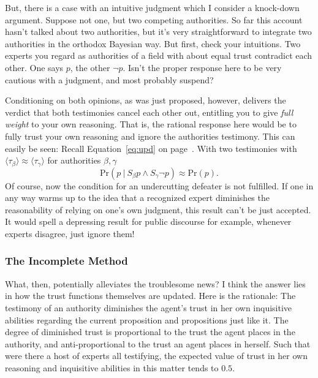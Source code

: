\documentclass[11pt, a4paper]{scrartcl}
\newcommand{\given}[1][]{\:#1\vert\:}
\renewcommand{\Pr}{\text{Pr}}
\renewcommand{\i}[1]{\emph{#1}}
\begin{document}
But, there is a case with an intuitive judgment which I consider a knock-down argument. Suppose not one, but two competing authorities. So far this account hasn't talked about two authorities, but it's very straightforward to integrate two authorities in the orthodox Bayesian way. But first, check your intuitions. Two experts you regard as authorities of a field with about equal trust contradict each other. One says $p$, the other $\neg p$. Isn't the proper response here to be very cautious with a judgment, and most probably suspend? 

Conditioning on both opinions, as was just proposed, however, delivers the verdict that both testimonies cancel each other out, entitling you to give \i{full weight} to your own reasoning. That is, the rational response here would be to fully trust your own reasoning and ignore the authorities testimony. This can easily be seen: Recall Equation~\ref{eq:upd} on page~\pageref{eq:upd}. With two testimonies with $\langle \tau_\beta \rangle \approx \langle \tau_\gamma \rangle$ for authorities $\beta, \gamma$
\[ \Pr(p \given S_\beta p \land S_\gamma \neg p) \approx \Pr(p). \] Of course, now the condition for an undercutting defeater is not fulfilled. If one in any way warms up to the idea that a recognized expert diminishes the reasonability of relying on one's own judgment, this result can't be just accepted. It would spell a depressing result for public discourse for example, whenever experts disagree, just ignore them!  

\subsubsection{The Incomplete Method}

What, then, potentially alleviates the troublesome news? I think the answer lies in how the trust functions themselves are updated. Here is the rationale: The testimony of an authority diminishes the agent's trust in her own inquisitive abilities regarding the current proposition and propositions just like it. The degree of diminished trust is proportional to the trust the agent places in the authority, and anti-proportional to the trust an agent places in herself. Such that were there a host of experts all testifying, the expected value of trust in her own reasoning and inquisitive abilities in this matter tends to $0.5$. 
\end{document}
